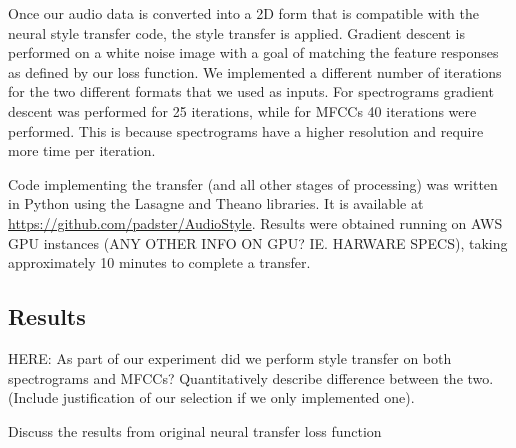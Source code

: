 \documentclass{article}
\begin{document}
Once our audio data is converted into a 2D form that is compatible with the neural style transfer code, the style transfer is applied. Gradient descent is performed on a white noise image with a goal of matching the feature responses as defined by our loss function. We implemented a different number of iterations for the two different formats that we used as inputs. For spectrograms gradient descent was performed for 25 iterations, while for MFCCs 40 iterations were performed. This is because spectrograms have a higher resolution and require more time per iteration.

Code implementing the transfer (and all other stages of processing) was written in Python using the Lasagne and Theano libraries. It is available at \url{https://github.com/padster/AudioStyle}. Results were obtained running on AWS GPU instances (ANY OTHER INFO ON GPU? IE. HARWARE SPECS), taking approximately 10 minutes to complete a transfer. 

\subsection{Results}

HERE: As part of our experiment did we perform style transfer on both spectrograms and MFCCs? Quantitatively describe difference between the two. (Include justification of our selection if we only implemented one).

Discuss the results from original neural transfer loss function
\end{document}
